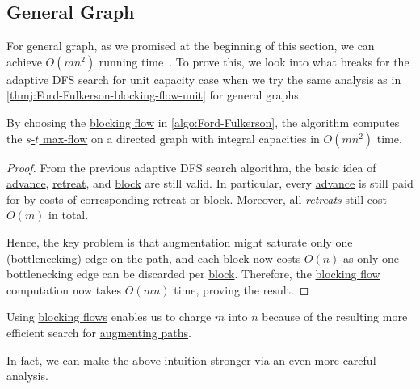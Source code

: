 \subsection{General Graph}
For general graph, as we promised at the beginning of this section, we can achieve \(O(mn^2)\) running time~\cite{karzanov1973finding,dinic1970algorithm,goldberg1998beyond}. To prove this, we look into what breaks for the adaptive DFS search for unit capacity case when we try the same analysis as in \autoref{thmj:Ford-Fulkerson-blocking-flow-unit} for general graphs.

\begin{theorem}\label{thm:Ford-Fulkerson-blocking-flow-general}
	By choosing the \hyperref[def:blocking-flow]{blocking flow} in \autoref{algo:Ford-Fulkerson}, the algorithm computes the \hyperref[prb:s-t-max-flow]{\(s\)-\(t\) max-flow} on a directed graph with integral capacities in \(O(mn^2)\) time.
\end{theorem}
\begin{proof}
	From the previous adaptive DFS search algorithm, the basic idea of \hyperref[algo:adaptive-DFS-advance]{advance}, \hyperref[algo:adaptive-DFS-retreat]{retreat}, and \hyperref[algo:adaptive-DFS-block]{block} are still valid. In particular, every \hyperref[algo:adaptive-DFS-advance]{advance} is still paid for by costs of corresponding \hyperref[algo:adaptive-DFS-retreat]{retreat} or \hyperref[algo:adaptive-DFS-block]{block}. Moreover, all \hyperref[algo:adaptive-DFS-retreat]{\emph{retreats}} still cost \(O(m)\) in total.

	Hence, the key problem is that augmentation might saturate only one (bottlenecking) edge on the path, and each \hyperref[algo:adaptive-DFS-block]{block} now costs \(O(n)\) as only one bottlenecking edge can be discarded per \hyperref[algo:adaptive-DFS-block]{block}. Therefore, the \hyperref[def:blocking-flow]{blocking flow} computation now takes \(O(mn)\) time, proving the result.
\end{proof}

\begin{intuition}
	Using \hyperref[def:blocking-flow]{blocking flows} enables us to charge \(m\) into \(n\) because of the resulting more efficient search for \hyperref[def:augmenting-path]{augmenting paths}.
\end{intuition}

In fact, we can make the above intuition stronger via an even more careful analysis.

